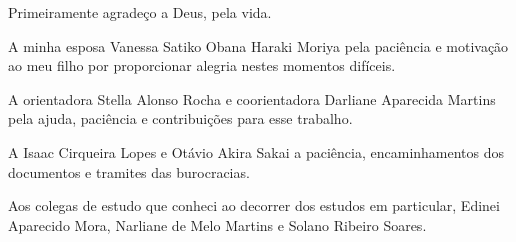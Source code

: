 
\begin{agradecimentos}[AGRADECIMENTOS]

Primeiramente agradeço a Deus, pela vida.

A minha esposa Vanessa Satiko Obana Haraki Moriya pela paciência e motivação ao meu filho por proporcionar alegria nestes momentos difíceis.

A orientadora Stella Alonso Rocha e coorientadora Darliane Aparecida Martins pela ajuda, paciência e contribuições para esse trabalho.

A Isaac Cirqueira Lopes e Otávio Akira Sakai a paciência, encaminhamentos dos documentos e tramites das burocracias.

Aos colegas de estudo que conheci ao decorrer dos estudos em particular, Edinei Aparecido Mora, Narliane de Melo Martins e Solano Ribeiro Soares.

\end{agradecimentos}
